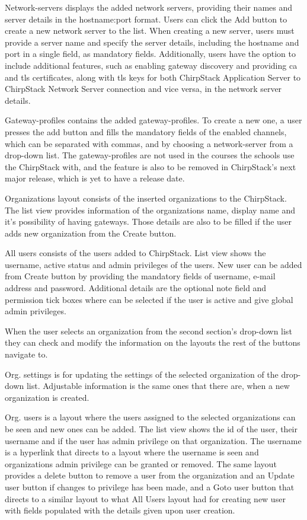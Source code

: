 Network-servers displays the added network servers, providing their names and server details in the hostname:port format.
Users can click the Add button to create a new network server to the list.
When creating a new server, users must provide a server name and specify the server details, including the hostname and port in a single field, as mandatory fields.
Additionally, users have the option to include additional features, such as enabling gateway discovery and providing \gls{ca} and \gls{tls} certificates, along with \gls{tls} keys for both ChirpStack Application Server to ChirpStack Network Server connection and vice versa, in the network server details.

Gateway-profiles contains the added gateway-profiles.
To create a new one, a user presses the add button and fills the mandatory fields of the enabled channels, which can be separated with commas, and by choosing a network-server from a drop-down list.
The gateway-profiles are not used in the courses the schools use the ChirpStack with, and the feature is also to be removed in ChirpStack's next major release, which is yet to have a release date.

Organizations layout consists of the inserted organizations to the ChirpStack.
The list view provides information of the organizations name, display name and it's possibility of having gateways.
Those details are also to be filled if the user adds new organization from the Create button.

All users consists of the users added to ChirpStack.
List view shows the username, active status and admin privileges of the users.
New user can be added from Create button by providing the mandatory fields of username, e-mail address and password. Additional details are the optional note field and permission tick boxes where can be selected if the user is active and give global admin privileges.

When the user selects an organization from the second section's drop-down list they can check and modify the information on the layouts the rest of the buttons navigate to.

Org. settings is for updating the settings of the selected organization of the drop-down list.
Adjustable information is the same ones that there are, when a new organization is created.

Org. users is a layout where the users assigned to the selected organizations can be seen and new ones can be added.
The list view shows the id of the user, their username and if the user has admin privilege on that organization.
The username is a hyperlink that directs to a layout where the username is seen and organizations admin privilege can be granted or removed.
The same layout provides a delete button to remove a user from the organization and an Update user button if changes to privilege has been made, and a Goto user button that directs to a similar layout to what All Users layout had for creating new user with fields populated with the details given upon user creation.


